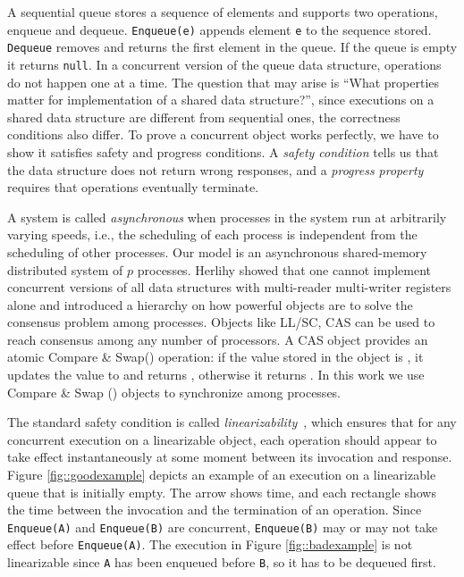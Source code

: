 \documentclass[10pt]{article}
\renewcommand{\it}[1]{\textit{#1}}
\renewcommand{\bf}[1]{\textbf{#1}}
\newcommand{\nf}[1]{{\normalfont{\texttt{#1}}}}
\theoremstyle{definition}
\begin{document}
A sequential queue stores a sequence of elements and supports two operations, enqueue and dequeue. \texttt{Enqueue(e)} appends element \texttt{e} to the sequence stored. \texttt{Dequeue} removes and returns the first element in the queue. If the queue is empty it returns \texttt{null}. In a concurrent version of the queue data structure, operations do not happen one at a time. The question that may arise is ``What properties matter for implementation of a shared data structure?'', since executions on a shared data structure are different from sequential ones, the correctness conditions also differ. To prove a concurrent object works perfectly, we have to show it satisfies safety and progress conditions. A \textit{safety condition} tells us that the data structure does not return wrong responses, and a \textit{progress property} requires that operations eventually terminate.

A system is called \it{asynchronous} when processes in the system run at arbitrarily varying speeds, i.e., the scheduling of each process is independent from the scheduling of other processes. Our model is an asynchronous shared-memory distributed system of $p$ processes. Herlihy \cite{10.1145/114005.102808} showed that one cannot implement concurrent versions of all data structures with multi-reader multi-writer registers alone and introduced a hierarchy on how powerful objects are to solve the consensus problem among processes. Objects like LL/SC, CAS can be used to reach consensus among any number of processors. A CAS object provides an atomic Compare \& Swap(\nf{new, old}) operation: if the value stored in the object is \nf{old}, it updates the value to \nf{new} and returns \nf{true}, otherwise it returns \nf{false}.  In this work we use Compare \& Swap (\nf{CAS}) objects to synchronize among  processes.


The standard safety condition is called \textit{linearizability}~\cite{10.1145/78969.78972}, which ensures that for any concurrent execution on a linearizable object, each operation should appear to take effect instantaneously at some moment between its invocation and response. Figure \ref{fig::goodexample} depicts an example of an execution on a linearizable  queue that is initially empty. The arrow shows time, and each rectangle shows the time between the invocation and the termination of an operation. Since \texttt{Enqueue(A)} and \texttt{Enqueue(B)} are concurrent, \texttt{Enqueue(B)} may or may not take effect before \texttt{Enqueue(A)}. The execution in Figure \ref{fig::badexample} is not linearizable since \texttt{A} has been enqueued before \texttt{B}, so it has to be dequeued first.
\end{document}
